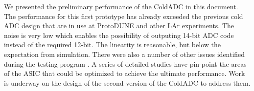 \label{sec:7}


We presented the preliminary performance of the ColdADC in this document. The performance for this first prototype
has already exceeded the previous cold ADC design that are in use at ProtoDUNE and other LAr experiments. 
The noise is very low which enables the possibility of outputing 14-bit ADC code instead of the required 12-bit.
The linearity is reasonable, but below the expectation from simulation. There were also a number of other 
issues identified during the testing program . A series of detailed  studies have pin-point the 
areas of the ASIC that could be optimized to achieve the ultimate performance. Work is underway on the design 
of the second version of the ColdADC to address them.

